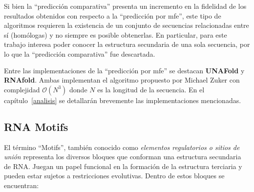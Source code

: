 Si bien la ``predicción comparativa'' presenta un incremento en la fidelidad de los resultados obtenidos con respecto a la ``predicción por mfe'', este tipo de algoritmos requieren la existencia de un conjunto de secuencias relacionadas entre sí (homólogas) y no siempre es posible obtenerlas. En particular, para este trabajo interesa poder conocer la estructura secundaria de una sola secuencia, por lo que la ``predicción comparativa'' fue descartada.

\par Entre las implementaciones de la ``predicción por mfe'' se destacan \textbf{UNAFold}\cite{unafold} y \textbf{RNAfold}\cite{Hofacker94}. Ambas implementan el algoritmo propuesto por Michael Zuker con complejidad $\mathcal{O}(N^{3})$ donde $N$ es la longitud de la secuencia. En el capítulo~\ref{analisis} se detallarán brevemente las implementaciones mencionadas.

\subsection{RNA Motifs}
\label{RNAmotifs}
El término ``Motifs''\cite{motifs}, también conocido como \emph{elementos regulatorios o sitios de unión} representa los diversos bloques que conforman una estructura secundaria de RNA. Juegan un papel funcional en la formación de la estructura terciaria y pueden estar sujetos a restricciones evolutivas. Dentro de estos bloques se encuentran:


